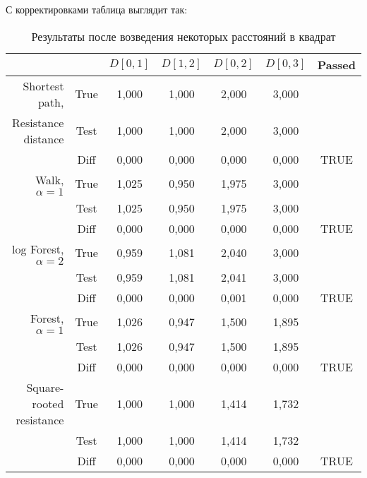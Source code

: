 \documentclass{article}
\begin{document}
С корректировками таблица выглядит так:

\begin{table}[H]
  \caption{Результаты после возведения некоторых расстояний в квадрат}
  \begin{center}
    \begin{tabular}{rc|cccc|c}
                         &      & $D[0, 1]$ & $D[1, 2]$ & $D[0, 2]$ & $D[0, 3]$ & Passed \\
                         \hline
Shortest path,     & True & 1,000       & 1,000       & 2,000       & 3,000       &        \\
Resistance distance  & Test & 1,000       & 1,000       & 2,000       & 3,000       &        \\
                         & Diff & 0,000       & 0,000       & 0,000       & 0,000       & TRUE   \\
                         \hline
Walk, $\alpha=1$ & True & 1,025       & 0,950       & 1,975       & 3,000       &        \\
                         & Test & 1,025       & 0,950       & 1,975       & 3,000       &        \\
                         & Diff & 0,000       & 0,000       & 0,000       & 0,000       & TRUE   \\
                         \hline
log Forest, $\alpha=2$ & True & 0,959       & 1,081       & 2,040       & 3,000       &        \\
                         & Test & 0,959       & 1,081       & 2,041       & 3,000       &        \\
                         & Diff & 0,000       & 0,000       & 0,001       & 0,000       & TRUE  \\
                         \hline
Forest, $\alpha=1$ & True & 1,026       & 0,947       & 1,500       & 1,895       &        \\
                         & Test & 1,026       & 0,947       & 1,500       & 1,895       &        \\
                         & Diff & 0,000       & 0,000       & 0,000       & 0,000       & TRUE  \\
                         \hline
Square-rooted resistance & True & 1,000       & 1,000       & 1,414       & 1,732       &        \\
                         & Test & 1,000       & 1,000       & 1,414       & 1,732       &        \\
                         & Diff & 0,000       & 0,000       & 0,000       & 0,000       & TRUE   \\

\end{tabular}
\end{center}
\end{table}
\end{document}
